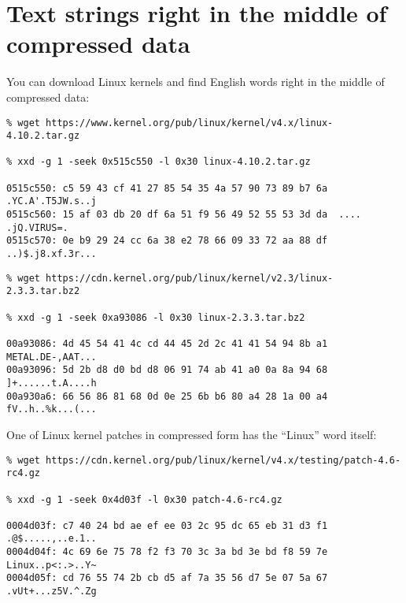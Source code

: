 \section{Text strings right in the middle of compressed data}

You can download Linux kernels and find English words right in the middle of compressed data:

\begin{lstlisting}
% wget https://www.kernel.org/pub/linux/kernel/v4.x/linux-4.10.2.tar.gz

% xxd -g 1 -seek 0x515c550 -l 0x30 linux-4.10.2.tar.gz

0515c550: c5 59 43 cf 41 27 85 54 35 4a 57 90 73 89 b7 6a  .YC.A'.T5JW.s..j
0515c560: 15 af 03 db 20 df 6a 51 f9 56 49 52 55 53 3d da  .... .jQ.VIRUS=.
0515c570: 0e b9 29 24 cc 6a 38 e2 78 66 09 33 72 aa 88 df  ..)$.j8.xf.3r...
\end{lstlisting}

\begin{lstlisting}
% wget https://cdn.kernel.org/pub/linux/kernel/v2.3/linux-2.3.3.tar.bz2

% xxd -g 1 -seek 0xa93086 -l 0x30 linux-2.3.3.tar.bz2

00a93086: 4d 45 54 41 4c cd 44 45 2d 2c 41 41 54 94 8b a1  METAL.DE-,AAT...
00a93096: 5d 2b d8 d0 bd d8 06 91 74 ab 41 a0 0a 8a 94 68  ]+......t.A....h
00a930a6: 66 56 86 81 68 0d 0e 25 6b b6 80 a4 28 1a 00 a4  fV..h..%k...(...
\end{lstlisting}

\iffalse
Even names can be found:

\begin{lstlisting}
% wget https://www.kernel.org/pub/linux/kernel/v2.6/linux-2.6.13.1.tar.bz2

% xxd -g 1 -seek 0x3dfbed -l 0x30 linux-2.6.13.1.tar.bz2

003dfbed: 24 88 a0 cc 5c 60 30 c2 46 28 a9 87 1b 13 30 6c  $...\`0.F(....0l
003dfbfd: 41 4c 49 43 45 14 2c 42 a5 2c ae 82 bf 98 e0 68  ALICE.,B.,.....h
003dfc0d: a4 19 41 26 81 94 20 3b d5 78 8e 89 d3 d0 1c a0  ..A&.. ;.x......
\end{lstlisting}
\fi

One of Linux kernel patches in compressed form has the ``Linux'' word itself:

\begin{lstlisting}
% wget https://cdn.kernel.org/pub/linux/kernel/v4.x/testing/patch-4.6-rc4.gz

% xxd -g 1 -seek 0x4d03f -l 0x30 patch-4.6-rc4.gz

0004d03f: c7 40 24 bd ae ef ee 03 2c 95 dc 65 eb 31 d3 f1  .@$.....,..e.1..
0004d04f: 4c 69 6e 75 78 f2 f3 70 3c 3a bd 3e bd f8 59 7e  Linux..p<:.>..Y~
0004d05f: cd 76 55 74 2b cb d5 af 7a 35 56 d7 5e 07 5a 67  .vUt+...z5V.^.Zg
\end{lstlisting}

